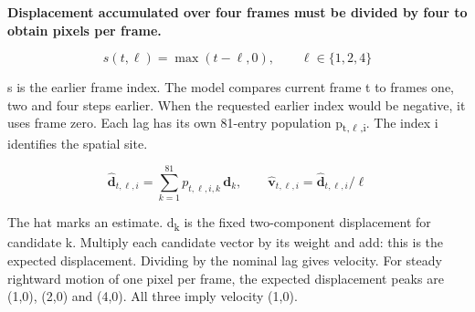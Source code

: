 \documentclass[11pt,letterpaper]{article}
\begin{document}
\textbf{Displacement accumulated over four frames must be divided by four to obtain pixels per frame.}


\begin{equation}s(t,\ell)=\max(t-\ell,0),\qquad \ell\in\{1,2,4\}\end{equation}

s is the earlier frame index. The model compares current frame t to frames one, two and four steps earlier. When the requested earlier index would be negative, it uses frame zero. Each lag has its own 81-entry population p\textsubscript{t,\(\ell\),i}. The index i identifies the spatial site.


\begin{equation}\widehat{\mathbf d}_{t,\ell,i}=\sum_{k=1}^{81}p_{t,\ell,i,k}\,\mathbf d_k,\qquad \widehat{\mathbf v}_{t,\ell,i}=\widehat{\mathbf d}_{t,\ell,i}/\ell\end{equation}

The hat marks an estimate. d\textsubscript{k} is the fixed two-component displacement for candidate k. Multiply each candidate vector by its weight and add: this is the expected displacement. Dividing by the nominal lag gives velocity. For steady rightward motion of one pixel per frame, the expected displacement peaks are (1,0), (2,0) and (4,0). All three imply velocity (1,0).
\end{document}
